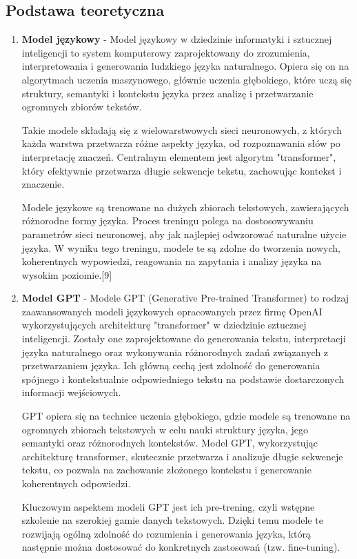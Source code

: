 \subsection{Podstawa teoretyczna}
\begin{enumerate}
    
    \item {\bf Model językowy} - Model językowy w dziedzinie informatyki i sztucznej inteligencji to system komputerowy zaprojektowany do zrozumienia, interpretowania i generowania ludzkiego języka naturalnego. Opiera się on na algorytmach uczenia maszynowego, głównie uczenia głębokiego, które uczą się struktury, semantyki i kontekstu języka przez analizę i przetwarzanie ogromnych zbiorów tekstów.

    Takie modele składają się z wielowarstwowych sieci neuronowych, z których każda warstwa przetwarza różne aspekty języka, od rozpoznawania słów po interpretację znaczeń. Centralnym elementem jest algorytm "transformer", który efektywnie przetwarza długie sekwencje tekstu, zachowując kontekst i znaczenie.
    
    Modele językowe są trenowane na dużych zbiorach tekstowych, zawierających różnorodne formy języka. Proces treningu polega na dostosowywaniu parametrów sieci neuronowej, aby jak najlepiej odwzorować naturalne użycie języka. W wyniku tego treningu, modele te są zdolne do tworzenia nowych, koherentnych wypowiedzi, reagowania na zapytania i analizy języka na wysokim poziomie.[9]
    \\
    \item {\bf Model GPT} - Modele GPT (Generative Pre-trained Transformer) to rodzaj zaawansowanych modeli językowych opracowanych przez firmę OpenAI wykorzystujących architekturę "transformer" w dziedzinie sztucznej inteligencji. Zostały one zaprojektowane do generowania tekstu, interpretacji języka naturalnego oraz wykonywania różnorodnych zadań związanych z przetwarzaniem języka. Ich główną cechą jest zdolność do generowania spójnego i kontekstualnie odpowiedniego tekstu na podstawie dostarczonych informacji wejściowych.

    GPT opiera się na technice uczenia głębokiego, gdzie modele są trenowane na ogromnych zbiorach tekstowych w celu nauki struktury języka, jego semantyki oraz różnorodnych kontekstów. Model GPT, wykorzystując architekturę transformer, skutecznie przetwarza i analizuje długie sekwencje tekstu, co pozwala na zachowanie złożonego kontekstu i generowanie koherentnych odpowiedzi.
    
    Kluczowym aspektem modeli GPT jest ich pre-trening, czyli wstępne szkolenie na szerokiej gamie danych tekstowych. Dzięki temu modele te rozwijają ogólną zdolność do rozumienia i generowania języka, którą następnie można dostosować do konkretnych zastosowań (tzw. fine-tuning).
    

\end{enumerate}
